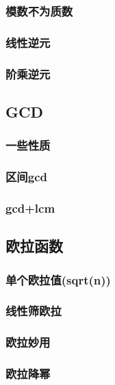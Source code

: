 \documentclass{article}
\begin{document}
\subsubsection{模数不为质数}

\subsubsection{线性逆元}

\subsubsection{阶乘逆元}


\subsection{GCD}
\subsubsection{一些性质}

\subsubsection{区间gcd}

\subsubsection{gcd+lcm}


\subsection{欧拉函数}
\subsubsection{单个欧拉值(sqrt(n))}

\subsubsection{线性筛欧拉}

\subsubsection{欧拉妙用}

\subsubsection{欧拉降幂}

\end{document}
